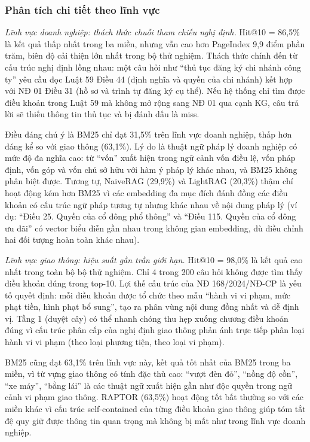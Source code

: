 \subsubsection*{Phân tích chi tiết theo lĩnh vực}

\textit{Lĩnh vực doanh nghiệp: thách thức chuỗi tham chiếu nghị định.}
Hit@10 = 86,5\% là kết quả thấp nhất trong ba miền, nhưng vẫn cao hơn PageIndex 9,9
điểm phần trăm, biên độ cải thiện lớn nhất trong bộ thử nghiệm. Thách thức chính
đến từ cấu trúc nghị định lồng nhau: một câu hỏi như ``thủ tục đăng ký chi nhánh công
ty'' yêu cầu đọc Luật 59 Điều 44 (định nghĩa và quyền của chi nhánh) kết hợp với NĐ
01 Điều 31 (hồ sơ và trình tự đăng ký cụ thể). Nếu hệ thống chỉ tìm được điều khoản
trong Luật 59 mà không mở rộng sang NĐ 01 qua cạnh KG, câu trả lời sẽ thiếu thông
tin thủ tục và bị đánh dấu là miss.

Điều đáng chú ý là BM25 chỉ đạt 31,5\% trên lĩnh vực doanh nghiệp, thấp hơn đáng
kể so với giao thông (63,1\%). Lý do là thuật ngữ pháp lý doanh nghiệp có mức độ đa
nghĩa cao: từ ``vốn'' xuất hiện trong ngữ cảnh vốn điều lệ, vốn pháp định, vốn góp và
vốn chủ sở hữu với hàm ý pháp lý khác nhau, và BM25 không phân biệt được. Tương
tự, NaiveRAG (29,9\%) và LightRAG (20,3\%) thậm chí hoạt động kém hơn BM25 vì
các embedding đa mục đích đánh đồng các điều khoản có cấu trúc ngữ pháp tương tự
nhưng khác nhau về nội dung pháp lý (ví dụ: ``Điều 25. Quyền của cổ đông phổ thông''
và ``Điều 115. Quyền của cổ đông ưu đãi'' có vector biểu diễn gần nhau trong không
gian embedding, dù điều chỉnh hai đối tượng hoàn toàn khác nhau).

\textit{Lĩnh vực giao thông: hiệu suất gần trần giới hạn.}
Hit@10 = 98,0\% là kết quả cao nhất trong toàn bộ bộ thử nghiệm. Chỉ 4 trong 200
câu hỏi không được tìm thấy điều khoản đúng trong top-10. Lợi thế cấu trúc của NĐ
168/2024/NĐ-CP là yếu tố quyết định: mỗi điều khoản được tổ chức theo mẫu ``hành
vi vi phạm, mức phạt tiền, hình phạt bổ sung'', tạo ra phân vùng nội dung đồng
nhất và dễ định vị. Tầng 1 (duyệt cây) có thể nhanh chóng thu hẹp xuống chương điều
khoản đúng vì cấu trúc phân cấp của nghị định giao thông phản ánh trực tiếp phân loại
hành vi vi phạm (theo loại phương tiện, theo loại vi phạm).

BM25 cũng đạt 63,1\% trên lĩnh vực này, kết quả tốt nhất của BM25 trong ba miền,
vì từ vựng giao thông có tính đặc thù cao: ``vượt đèn đỏ'', ``nồng độ cồn'', ``xe máy'',
``bằng lái'' là các thuật ngữ xuất hiện gần như độc quyền trong ngữ cảnh vi phạm giao
thông. RAPTOR (63,5\%) hoạt động tốt bất thường so với các miền khác vì cấu trúc
self-contained của từng điều khoản giao thông giúp tóm tắt đệ quy giữ được thông tin
quan trọng mà không bị mất như trong lĩnh vực doanh nghiệp.

